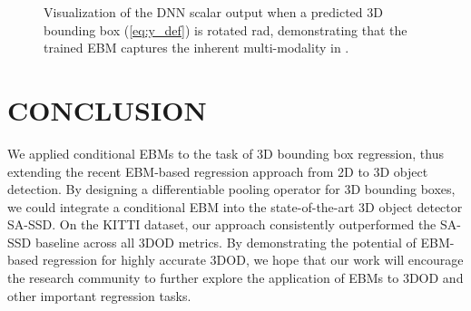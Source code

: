 \documentclass[letterpaper, 10 pt, conference]{ieeeconf}
\begin{document}
\begin{figure}[t]
\vspace{-2mm}
    \caption{Visualization of the DNN scalar output  when a predicted 3D bounding box  (\ref{eq:y_def}) is rotated  rad, demonstrating that the trained EBM  captures the inherent multi-modality in .}\vspace{-3mm}
    \label{fig:viz_angle}
\end{figure}






 \section{CONCLUSION}
\label{section:conclusion}
We applied conditional EBMs  to the task of 3D bounding box regression, thus extending the recent EBM-based regression approach from 2D to 3D object detection. By designing a differentiable pooling operator for 3D bounding boxes, we could integrate a conditional EBM  into the state-of-the-art 3D object detector SA-SSD. On the KITTI dataset, our approach consistently outperformed the SA-SSD baseline across all 3DOD metrics. By demonstrating the potential of EBM-based regression for highly accurate 3DOD, we hope that our work will encourage the research community to further explore the application of EBMs to 3DOD and other important regression tasks.

 









\end{document}

